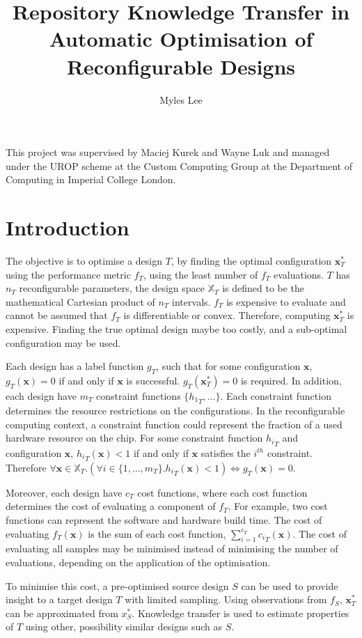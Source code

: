 \documentclass[10pt,a4paper]{article}
\author{Myles Lee}
\title{Repository Knowledge Transfer in Automatic Optimisation of
Reconfigurable Designs}
\begin{document}
\maketitle
This project was supervised by Maciej Kurek and Wayne Luk and managed under the UROP scheme at the Custom Computing Group at the Department of Computing in Imperial College London.

\section{Introduction}
The objective is to optimise a design $T$, by finding the optimal configuration $\mathbf{x}_T^*$ using the performance metric $f_T$, using the least number of $f_T$ evaluations. $T$ has $n_T$ reconfigurable parameters, the design space $\mathbb{X}_T$ is defined to be the mathematical Cartesian product of $n_T$ intervals. $f_T$ is expensive to evaluate and cannot be assumed that $f_T$ is differentiable or convex. Therefore, computing $\mathbf{x}_T^*$ is expensive. Finding the true optimal design maybe too costly, and a sub-optimal configuration may be used.

Each design has a label function $g_T$, such that for some configuration $\mathbf{x}$, $g_T(\mathbf{x})=0$ if and only if $\mathbf{x}$ is successful. $g_T(\mathbf{x}_T^*)=0$ is required. In addition, each design have $m_T$ constraint functions $\{{h_1}_T,...\}$. Each constraint function determines the resource restrictions on the configurations. In the reconfigurable computing context, a constraint function could represent the fraction of a used hardware resource on the chip. For some constraint function ${h_i}_T$ and configuration $\mathbf{x}$, ${h_i}_T(\mathbf{x})<1$ if and only if $\mathbf{x}$ satisfies the $i^{th}$ constraint. Therefore $\forall \mathbf{x}\in\mathbb{X}_T.(\forall i\in\{1,...,m_T\}.{h_i}_T(\mathbf{x})<1)\Leftrightarrow g_T(\mathbf{x})=0$.

Moreover, each design have $c_T$ cost functions, where each cost function determines the cost of evaluating a component of $f_T$. For example, two cost functions can represent the software and hardware build time. The cost of evaluating $f_T(\mathbf{x})$ is the sum of each cost function, $\sum_{i=1}^{c_T}{c_i}_T(\mathbf{x})$. The cost of evaluating all samples may be minimised instead of minimising the number of evaluations, depending on the application of the optimisation.

To minimise this cost, a pre-optimised source design $S$ can be used to provide insight to a target design $T$ with limited sampling. Using observations from $f_S$, $\mathbf{x}_T^*$ can be approximated from $x_S^*$. Knowledge transfer is used to estimate properties of $T$ using other, possibility similar designs such as $S$. 
\end{document}
